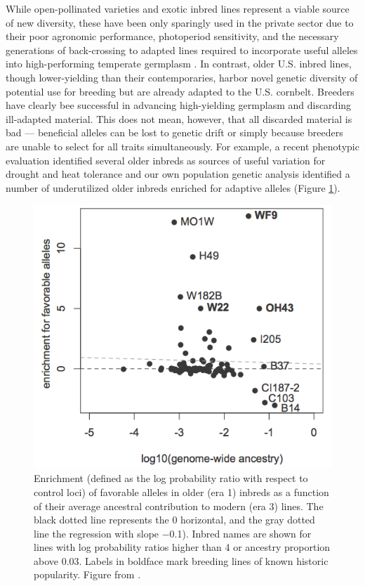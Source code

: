 \documentclass[draft,12pt]{article}
\begin{document}
While open-pollinated varieties and exotic inbred lines represent a viable source of new diversity, these have been only sparingly used in the private sector due to their poor agronomic performance, photoperiod sensitivity, and the necessary generations of back-crossing to adapted lines required to incorporate useful alleles into high-performing temperate germplasm \citep{goodman1999broadening}.
In contrast, older U.S. inbred lines, though lower-yielding than their contemporaries, harbor novel genetic diversity of potential use for breeding but are already adapted to the U.S. cornbelt.  
Breeders have clearly bee successful in advancing high-yielding germplasm and discarding ill-adapted material.
This does not mean, however, that all discarded material is bad --- beneficial alleles can be lost to genetic drift or simply because breeders are unable to select for all traits simultaneously. 
For example, a recent phenotypic evaluation identified several older inbreds as sources of useful variation for drought and heat tolerance \citep{chen2012characterization} and our own population genetic analysis identified a number of underutilized older inbreds enriched for adaptive alleles (Figure \ref{fig:wf9}).

\begin{figure}
\includegraphics[width=0.5\linewidth]{joost_wf9.png}
\caption{Enrichment (defined as the log probability ratio with respect to control loci) of favorable alleles in older (era 1) inbreds as a function of their average ancestral contribution to modern (era 3) lines. The black dotted line represents the 0 horizontal, and the gray dotted line the regression  with slope −0.1). Inbred names are shown for lines with log probability ratios higher than 4 or ancestry proportion above 0.03. Labels in boldface mark breeding lines of known historic popularity. Figure from \citet{van2012historical}.} 
\label{fig:wf9}
\end{figure}
\end{document}
